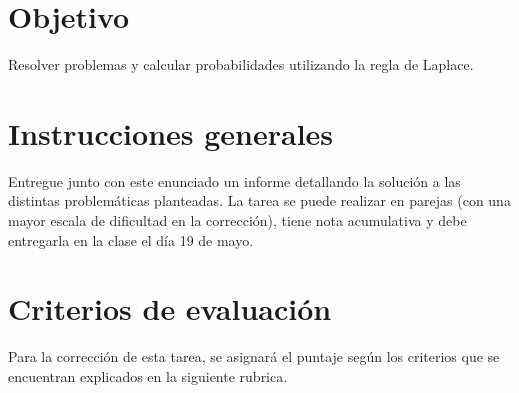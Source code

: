 \documentclass[]{srs}
\begin{document}
\section*{Objetivo}
  Resolver problemas y calcular probabilidades utilizando la regla de Laplace.

\section*{Instrucciones generales}
  Entregue junto con este enunciado un informe detallando la solución a las
  distintas problemáticas planteadas. La tarea se puede realizar en parejas
  (con una mayor escala de dificultad en la corrección), tiene nota acumulativa
  y debe entregarla en la clase el día 19 de mayo.

\section*{Criterios de evaluación}
  Para la corrección de esta tarea, se asignará el puntaje según los criterios que
  se encuentran explicados en la siguiente rubrica.
\end{document}

